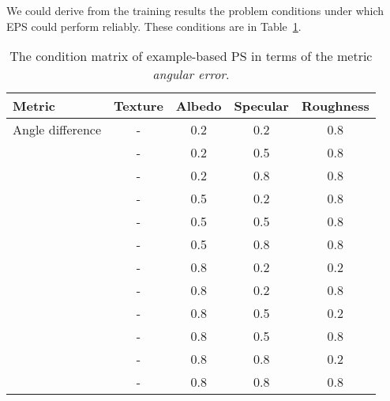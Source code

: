 We could derive from the training results the problem conditions under which EPS could perform reliably. These conditions are in Table~\ref{tab:ps_training_result}.
\begin{table}[!htbp]
  \centering
  \begin{tabular}{l*{4}{c}}
  \hline
  \textbf{Metric} & Texture & Albedo & Specular & Roughness\\
  \hline
  Angle difference & - & 0.2 & 0.2 & 0.8\\
                   & - & 0.2 & 0.5 & 0.8\\
                   & - & 0.2 & 0.8 & 0.8\\
                   & - & 0.5 & 0.2 & 0.8\\
                   & - & 0.5 & 0.5 & 0.8\\
                   & - & 0.5 & 0.8 & 0.8\\
                   & - & 0.8 & 0.2 & 0.2\\ %
                   & - & 0.8 & 0.2 & 0.8\\
                   & - & 0.8 & 0.5 & 0.2\\
                   & - & 0.8 & 0.5 & 0.8\\
                   & - & 0.8 & 0.8 & 0.2\\ %
                   & - & 0.8 & 0.8 & 0.8\\
  \hline
  \end{tabular}
  \caption{The condition matrix of example-based PS in terms of the metric \textit{angular error}.}
  \label{tab:ps_training_result}
\end{table}

